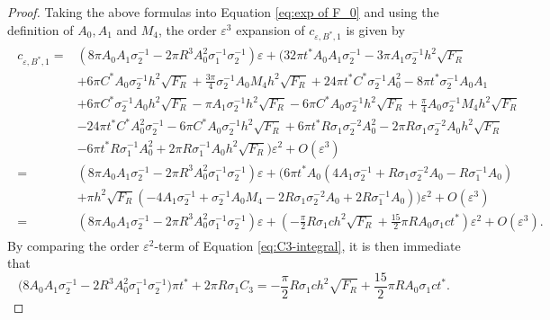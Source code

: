 \documentclass[12pt,reqno]{amsart}
\numberwithin{equation}{section}
\theoremstyle{definition}
\theoremstyle{remark}
\begin{document}
\begin{proof}
Taking the above formulas into Equation \eqref{eq:exp of F_0} and using the definition of $ A_0,A_1 $ and $ M_4 $,  the  order $ \varepsilon^3  $ expansion  of $ c_{\varepsilon,B^*,1} $ is given by
\begin{align*}%
\begin{split}
c_{\varepsilon,B^*,1}=&\left( 8\pi A_0 A_1\sigma_2^{-1} -2\pi R^3 A_0^2\sigma_1^{-1}\sigma_2^{-1}\right)  \varepsilon + \biggl(32\pi t^* A_0A_1 \sigma_2^{-1}-3\pi A_1 \sigma_2^{-1} h^2 \sqrt{F_R}  \\
&+6\pi C^* A_0 \sigma_2^{-1} h^2 \sqrt{F_R}+\frac{3\pi}{4}\sigma_2^{-1} A_0 M_4   h^2 \sqrt{F_R}   + 24 \pi t^*  C^*\sigma_2^{-1} A_0^2    -8\pi t^*\sigma_2^{-1} A_0   A_1  \\
&+ 6\pi C^*  \sigma_2^{-1} A_0  h^2 \sqrt{F_R}-\pi A_1 \sigma_2^{-1} h^2 \sqrt{F_R}   -6\pi C^* A_0 \sigma_2^{-1} h^2 \sqrt{F_R}+\frac{\pi}{4} A_0 \sigma_2^{-1}    M_4   h^2 \sqrt{F_R}\\
&  - 24\pi t^*   C^* A_0^2 \sigma_2^{-1}       -6\pi  C^* A_0 \sigma_2^{-1}h^2 \sqrt{F_R}+ 6\pi t^*R \sigma_1 \sigma_2^{-2} A_0^2-2\pi R \sigma_1 \sigma_2^{-2} A_0 h^2 \sqrt{F_R}\\
&- 6\pi t^*R   \sigma_1^{-1} A_0^2+2\pi R \sigma_1^{-1}   A_0 h^2 \sqrt{F_R}\biggr)\varepsilon^2+O(\varepsilon^3)\\
=&\left( 8\pi A_0 A_1\sigma_2^{-1} -2\pi R^3 A_0^2\sigma_1^{-1}\sigma_2^{-1}\right)  \varepsilon+\biggl( 6\pi t^* A_0\left( 4A_1 \sigma_2^{-1}+    R \sigma_1 \sigma_2^{-2} A_0  - R   \sigma_1^{-1} A_0 \right)    \\
&  +\pi h^2 \sqrt{F_R}\left (-4 A_1 \sigma_2^{-1}+  \sigma_2^{-1} A_0 M_4-2  R \sigma_1 \sigma_2^{-2} A_0+   2  R \sigma_1^{-1}   A_0\right ) \biggr)\varepsilon^2+O(\varepsilon^3)\\
=&\left( 8\pi A_0 A_1\sigma_2^{-1} -2\pi R^3 A_0^2\sigma_1^{-1}\sigma_2^{-1}\right)  \varepsilon+\left( -\frac{\pi }{2}R\sigma_1ch^2\sqrt{F_R}+\frac{15}{2}\pi RA_0\sigma_1ct^*\right) \varepsilon^2+O(\varepsilon^3).
\end{split}
\end{align*}
By comparing the order $ \varepsilon^2 $-term of Equation \eqref{eq:C3-integral}, it is then immediate   that  
\begin{equation*}%
\bigl(8A_0A_1\sigma_2^{-1}-2R^3A_0^2\sigma_1^{-1}\sigma_2^{-1}\bigr)\pi t^*+2\pi R\sigma_1C_3
=-\frac{\pi }{2}R\sigma_1ch^2\sqrt{F_R}+\frac{15}{2}\pi RA_0\sigma_1ct^*.
\end{equation*}

\end{proof}
\end{document}
